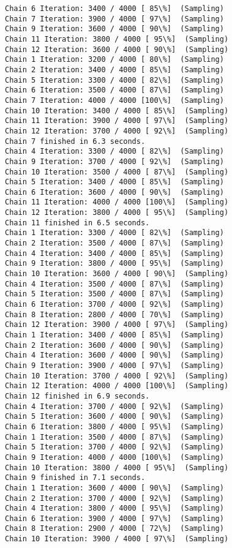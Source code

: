 \documentclass[11pt]{article}
\begin{document}
\begin{Verbatim}[commandchars=\\\{\}]
Chain 6 Iteration: 3400 / 4000 [ 85\%]  (Sampling)
Chain 7 Iteration: 3900 / 4000 [ 97\%]  (Sampling)
Chain 9 Iteration: 3600 / 4000 [ 90\%]  (Sampling)
Chain 11 Iteration: 3800 / 4000 [ 95\%]  (Sampling)
Chain 12 Iteration: 3600 / 4000 [ 90\%]  (Sampling)
Chain 1 Iteration: 3200 / 4000 [ 80\%]  (Sampling)
Chain 2 Iteration: 3400 / 4000 [ 85\%]  (Sampling)
Chain 5 Iteration: 3300 / 4000 [ 82\%]  (Sampling)
Chain 6 Iteration: 3500 / 4000 [ 87\%]  (Sampling)
Chain 7 Iteration: 4000 / 4000 [100\%]  (Sampling)
Chain 10 Iteration: 3400 / 4000 [ 85\%]  (Sampling)
Chain 11 Iteration: 3900 / 4000 [ 97\%]  (Sampling)
Chain 12 Iteration: 3700 / 4000 [ 92\%]  (Sampling)
Chain 7 finished in 6.3 seconds.
Chain 4 Iteration: 3300 / 4000 [ 82\%]  (Sampling)
Chain 9 Iteration: 3700 / 4000 [ 92\%]  (Sampling)
Chain 10 Iteration: 3500 / 4000 [ 87\%]  (Sampling)
Chain 5 Iteration: 3400 / 4000 [ 85\%]  (Sampling)
Chain 6 Iteration: 3600 / 4000 [ 90\%]  (Sampling)
Chain 11 Iteration: 4000 / 4000 [100\%]  (Sampling)
Chain 12 Iteration: 3800 / 4000 [ 95\%]  (Sampling)
Chain 11 finished in 6.5 seconds.
Chain 1 Iteration: 3300 / 4000 [ 82\%]  (Sampling)
Chain 2 Iteration: 3500 / 4000 [ 87\%]  (Sampling)
Chain 4 Iteration: 3400 / 4000 [ 85\%]  (Sampling)
Chain 9 Iteration: 3800 / 4000 [ 95\%]  (Sampling)
Chain 10 Iteration: 3600 / 4000 [ 90\%]  (Sampling)
Chain 4 Iteration: 3500 / 4000 [ 87\%]  (Sampling)
Chain 5 Iteration: 3500 / 4000 [ 87\%]  (Sampling)
Chain 6 Iteration: 3700 / 4000 [ 92\%]  (Sampling)
Chain 8 Iteration: 2800 / 4000 [ 70\%]  (Sampling)
Chain 12 Iteration: 3900 / 4000 [ 97\%]  (Sampling)
Chain 1 Iteration: 3400 / 4000 [ 85\%]  (Sampling)
Chain 2 Iteration: 3600 / 4000 [ 90\%]  (Sampling)
Chain 4 Iteration: 3600 / 4000 [ 90\%]  (Sampling)
Chain 9 Iteration: 3900 / 4000 [ 97\%]  (Sampling)
Chain 10 Iteration: 3700 / 4000 [ 92\%]  (Sampling)
Chain 12 Iteration: 4000 / 4000 [100\%]  (Sampling)
Chain 12 finished in 6.9 seconds.
Chain 4 Iteration: 3700 / 4000 [ 92\%]  (Sampling)
Chain 5 Iteration: 3600 / 4000 [ 90\%]  (Sampling)
Chain 6 Iteration: 3800 / 4000 [ 95\%]  (Sampling)
Chain 1 Iteration: 3500 / 4000 [ 87\%]  (Sampling)
Chain 5 Iteration: 3700 / 4000 [ 92\%]  (Sampling)
Chain 9 Iteration: 4000 / 4000 [100\%]  (Sampling)
Chain 10 Iteration: 3800 / 4000 [ 95\%]  (Sampling)
Chain 9 finished in 7.1 seconds.
Chain 1 Iteration: 3600 / 4000 [ 90\%]  (Sampling)
Chain 2 Iteration: 3700 / 4000 [ 92\%]  (Sampling)
Chain 4 Iteration: 3800 / 4000 [ 95\%]  (Sampling)
Chain 6 Iteration: 3900 / 4000 [ 97\%]  (Sampling)
Chain 8 Iteration: 2900 / 4000 [ 72\%]  (Sampling)
Chain 10 Iteration: 3900 / 4000 [ 97\%]  (Sampling)

\end{Verbatim}
\end{document}
